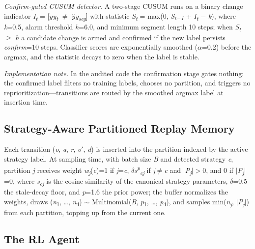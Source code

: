 \documentclass[conference,9pt]{IEEEtran}
\begin{document}
\textit{Confirm-gated CUSUM detector.} A two-stage CUSUM runs on a binary change indicator \textit{I\textit{\textsubscript{t}}} = [\textit{$\hat{y}$y\textit{\textsubscript{t}}} $\neq$ \textit{$\hat{y}$y\textit{\textsubscript{seg}}}] with statistic \textit{S\textit{\textsubscript{t}}} = max(0, \textit{S\textit{\textsubscript{t$-$1}}} + \textit{I\textit{\textsubscript{t}}} $-$ \textit{k}), where \textit{k}=0.5, alarm threshold \textit{h}=6.0, and minimum segment length 10 steps; when \textit{S\textit{\textsubscript{t}}} $\ge$ \textit{h} a candidate change is armed and confirmed if the new label persists \textit{confirm}=10 steps. Classifier scores are exponentially smoothed ($\alpha$=0.2) before the argmax, and the statistic decays to zero when the label is stable.

\textit{Implementation note.} In the audited code the confirmation stage gates nothing: the confirmed label filters no training labels, chooses no partition, and triggers no reprioritization---transitions are routed by the smoothed argmax label at insertion time.

\subsection{Strategy-Aware Partitioned Replay Memory}

Each transition (\textit{o}, \textit{a}, \textit{r}, \textit{o}$'$, \textit{d}) is inserted into the partition indexed by the active strategy label. At sampling time, with batch size \textit{B} and detected strategy \textit{c}, partition \textit{j} receives weight \textit{w\textit{\textsubscript{j}}}(\textit{c})=1 if \textit{j}=\textit{c}, \textit{$\delta$s\textit{\textsuperscript{p}}\textit{\textsubscript{cj}}} if \textit{j}$\neq$\textit{c} and $|$\textit{P\textit{\textsubscript{j}}}$|$$>$0, and 0 if $|$\textit{P\textit{\textsubscript{j}}}$|$=0, where \textit{s\textit{\textsubscript{cj}}} is the cosine similarity of the canonical strategy parameters, \textit{$\delta$}=0.5 the stale-decay floor, and \textit{p}=1.6 the prior power; the buffer normalizes the weights, draws (\textit{n}\textsubscript{1}, \ldots{}, \textit{n}\textsubscript{4}) $\sim$ Multinomial(\textit{B}, \textit{p}\textsubscript{1}, \ldots{}, \textit{p}\textsubscript{4}), and samples min(\textit{n\textit{\textsubscript{j}}}, $|$\textit{P\textit{\textsubscript{j}}}$|$) from each partition, topping up from the current one.

\subsection{The RL Agent}
\end{document}
